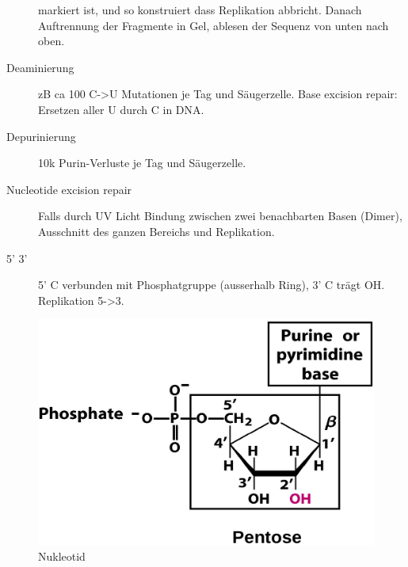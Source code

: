 \documentclass[a4paper,twocolumn,english,fontsize=7,DIV=16]{scrartcl}
\begin{document}
\begin{description}
		markiert ist, und so konstruiert dass Replikation abbricht.
		Danach Auftrennung der Fragmente in Gel, ablesen der Sequenz
		von unten nach oben.
	\item[Deaminierung] zB ca 100 C->U Mutationen je Tag und Säugerzelle.
		Base excision repair: Ersetzen aller U durch C in DNA.
	\item[Depurinierung] 10k Purin-Verluste je Tag und Säugerzelle.
	\item[Nucleotide excision repair] Falls durch UV Licht Bindung zwischen
		zwei benachbarten Basen (Dimer), Ausschnitt des ganzen Bereichs
		und Replikation.
	\item[5' 3'] 5' C verbunden mit Phosphatgruppe (ausserhalb Ring), 3' C
		trägt OH. Replikation 5->3.
\end{description}

\begin{figure}
	\centering
	\includegraphics[width=\linewidth]{img/nukleotid.png}
	\caption{Nukleotid}
\end{figure}
\end{document}
